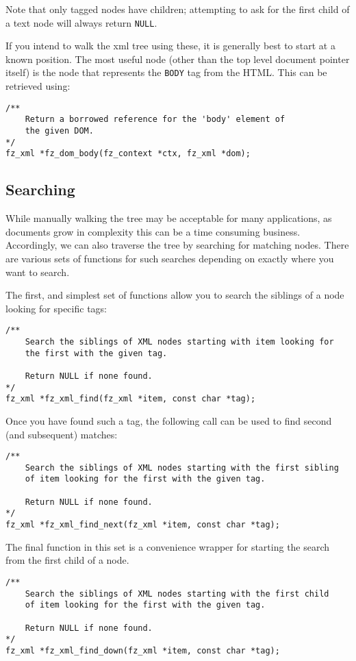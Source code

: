 \documentclass[oneside]{book}
\begin{document}
Note that only tagged nodes have children; attempting to ask for the first child of a text node will always return \texttt{NULL}.

If you intend to walk the xml tree using these, it is generally best to start at a known position. The most useful node (other than the top level document pointer itself) is the node that represents the \texttt{BODY} tag from the HTML. This can be retrieved using:

\begin{lstlisting}
/**
	Return a borrowed reference for the 'body' element of
	the given DOM.
*/
fz_xml *fz_dom_body(fz_context *ctx, fz_xml *dom);
\end{lstlisting}

\subsection{Searching}

While manually walking the tree may be acceptable for many applications, as documents grow in complexity this can be a time consuming business. Accordingly, we can also traverse the tree by searching for matching nodes. There are various sets of functions for such searches depending on exactly where you want to search.

The first, and simplest set of functions allow you to search the siblings of a node looking for specific tags:

\begin{lstlisting}
/**
	Search the siblings of XML nodes starting with item looking for
	the first with the given tag.

	Return NULL if none found.
*/
fz_xml *fz_xml_find(fz_xml *item, const char *tag);
\end{lstlisting}

Once you have found such a tag, the following call can be used to find second (and subsequent) matches:

\begin{lstlisting}
/**
	Search the siblings of XML nodes starting with the first sibling
	of item looking for the first with the given tag.

	Return NULL if none found.
*/
fz_xml *fz_xml_find_next(fz_xml *item, const char *tag);
\end{lstlisting}

The final function in this set is a convenience wrapper for starting the search from the first child of a node.

\begin{lstlisting}
/**
	Search the siblings of XML nodes starting with the first child
	of item looking for the first with the given tag.

	Return NULL if none found.
*/
fz_xml *fz_xml_find_down(fz_xml *item, const char *tag);
\end{lstlisting}
\end{document}
